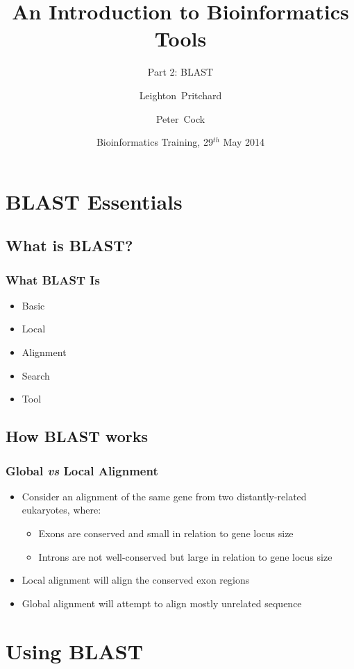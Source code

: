\documentclass[table]{beamer}
\title[Intro to Bioinformatics] %
{An Introduction to Bioinformatics Tools}
\subtitle{Part 2: BLAST}
\author[Pritchard, Cock] %
{Leighton~Pritchard \and Peter~Cock}
\institute[The James Hutton Institute] %
{
  Information and Computational Sciences\\
  The James Hutton Institute
}
\date[May 2014] %
{Bioinformatics Training, 29$^{th}$ May 2014}
\begin{document}
  \frame[plain]{\titlepage}
  
  \section{BLAST Essentials}
  
    \subsection{What is BLAST?}
    \begin{frame}
     \frametitle{What BLAST Is}
     \begin{itemize}
       \item Basic
       \item Local
       \item Alignment
       \item Search
       \item Tool
     \end{itemize}
    \end{frame}
  
    \subsection{How BLAST works}
    \begin{frame}
     \frametitle{Global \textit{vs} Local Alignment}
     \begin{itemize}
       \item Consider an alignment of the same gene from two distantly-related eukaryotes, where:
         \begin{itemize}
           \item Exons are conserved and small in relation to gene locus size
           \item Introns are not well-conserved but large in relation to gene locus size
         \end{itemize}
       \item Local alignment will align the conserved exon regions
       \item Global alignment will attempt to align mostly unrelated sequence
     \end{itemize}
    \end{frame}
   
   
   
  \section{Using BLAST}
\end{document}
